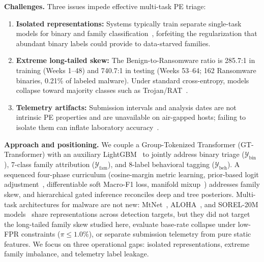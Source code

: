 \documentclass[Number]{sn-jnl}
\begin{document}
\noindent\textbf{Challenges.}
Three issues impede effective multi-task PE triage:
\begin{enumerate}[leftmargin=*]
\item \textbf{Isolated representations:} Systems typically train separate single-task models for binary and family classification~\cite{horvath2026comparative,demirkiran2024evaluating,wadho2026benchmarking}, forfeiting the regularization that abundant binary labels could provide to data-starved families.
\item \textbf{Extreme long-tailed skew:} The Benign-to-Ransomware ratio is 285.7:1 in training (Weeks 1--48) and 740.7:1 in testing (Weeks 53--64; 162 Ransomware binaries, 0.21\% of labeled malware). Under standard cross-entropy, models collapse toward majority classes such as Trojan/RAT~\cite{menon2021long,cui2019class}.
\item \textbf{Telemetry artifacts:} Submission intervals and analysis dates are not intrinsic PE properties and are unavailable on air-gapped hosts; failing to isolate them can inflate laboratory accuracy~\cite{joyce2025ember2024,dolejs2026graybox}.
\end{enumerate}

\noindent\textbf{Approach and positioning.}
We couple a Group-Tokenized Transformer (GT-Transformer) with an auxiliary LightGBM~\cite{ke2017lightgbm} to jointly address binary triage ($\mathcal{Y}_\text{bin}$), 7-class family attribution ($\mathcal{Y}_\text{fam}$), and 8-label behavioral tagging ($\mathcal{Y}_\text{beh}$). A sequenced four-phase curriculum (cosine-margin metric learning, prior-based logit adjustment~\cite{menon2021long}, differentiable soft Macro-F1 loss, manifold mixup~\cite{verma2019manifold}) addresses family skew, and hierarchical gated inference reconciles deep and tree posteriors. Multi-task architectures for malware are not new: MtNet~\cite{huang2016mtnet}, ALOHA~\cite{rudd2019aloha}, and SOREL-20M models~\cite{harang2020sorel} share representations across detection targets, but they did not target the long-tailed family skew studied here, evaluate base-rate collapse under low-FPR constraints ($\pi\le1.0\%$), or separate submission telemetry from pure static features. We focus on three operational gaps: isolated representations, extreme family imbalance, and telemetry label leakage.
\end{document}
